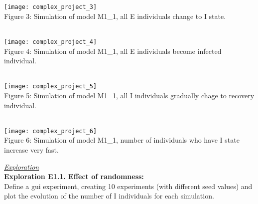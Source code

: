 \documentclass{article}
\begin{document}
\texttt{[image: complex\_project\_3]}
\\
\caption{Figure 3: Simulation of model M1\_1, all E individuals change to I state.}
\\
\texttt{[image: complex\_project\_4]}
\\
\caption{Figure 4: Simulation of model M1\_1, all E individuals become infected individual.}
\\
\texttt{[image: complex\_project\_5]}
\\
\caption{Figure 5: Simulation of model M1\_1, all I individuals gradually chage to recovery individual.}
\\
\texttt{[image: complex\_project\_6]}
\\
\caption{Figure 6: Simulation of model M1\_1, number of individuals who have I state increase very fast.}
\newpage
\underline{\emph{Exploration}}
\\
\textbf{Exploration E1.1. Effect of randomness:}
\\
Define a gui experiment, creating 10 experiments (with different seed values) and plot the evolution of the number of I individuals for each simulation.
\\
\lstset{style=mystyle2}
\end{document}
